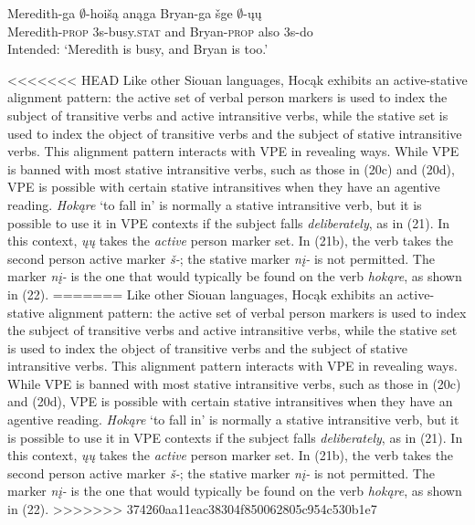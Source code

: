 \documentclass[output=paper]{LSP/langsci}
\begin{document}
\begin{exe}
\begin{xlist}
{Meredith-ga $\emptyset$-hoi\v{s}\k{a} an\k{a}ga Bryan-ga \v{s}ge $\emptyset$-\k{u}\k{u}\\
Meredith-\textsc{prop} {\textsc 3s}-busy.\textsc{stat} and Bryan-\textsc{prop} also {\textsc 3s}-do\\
\trans Intended: `Meredith is busy, and Bryan is too.'}
\end{xlist}
\end{exe}

<<<<<<< HEAD
Like other Siouan languages, Hocąk exhibits an active-stative alignment pattern: the active set of verbal person markers is used to index the subject of transitive verbs and active intransitive verbs, while the stative set is used to index the object of transitive verbs and the subject of stative intransitive verbs. This alignment pattern interacts with VPE in revealing ways. While VPE is banned with most stative intransitive verbs, such as those in (20c) and (20d), VPE is possible with certain stative intransitives when they have an agentive reading. \emph{Hokąre} `to fall in' is normally a stative intransitive verb, but it is possible to use it in VPE contexts if the subject falls \emph{deliberately}, as in (21). In this context, \emph{ųų} takes the \emph{active} person marker set. In (21b), the verb takes the second person active marker \emph{š-}; the stative marker \emph{nį-} is not permitted. The marker \emph{nį-} is the one that would typically be found on the verb \emph{hokąre}, as shown in (22).
=======
Like other Siouan languages, Hoc\k{a}k exhibits an active-stative alignment pattern: the active set of verbal person markers is used to index the subject of transitive verbs and active intransitive verbs, while the stative set is used to index the object of transitive verbs and the subject of stative intransitive verbs. This alignment pattern interacts with VPE in revealing ways. While VPE is banned with most stative intransitive verbs, such as those in (20c) and (20d), VPE is possible with certain stative intransitives when they have an agentive reading. \emph{Hok\k{a}re} `to fall in' is normally a stative intransitive verb, but it is possible to use it in VPE contexts if the subject falls \emph{deliberately}, as in (21). In this context, \emph{\k{u}\k{u}} takes the \emph{active} person marker set. In (21b), the verb takes the second person active marker \emph{\v{s}-}; the stative marker \emph{n\k{i}-} is not permitted. The marker \emph{n\k{i}-} is the one that would typically be found on the verb \emph{hok\k{a}re}, as shown in (22).
>>>>>>> 374260aa11eac38304f850062805c954c530b1e7
\end{document}
